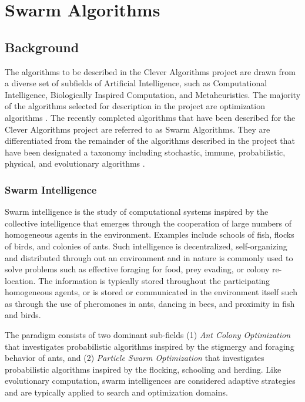 \documentclass[a4paper, 11pt]{article}
\begin{document}
\section{Swarm Algorithms}
\label{sec:algorithms}

% 
% 
\subsection{Background}
The algorithms to be described in the Clever Algorithms project are drawn from a diverse set of subfields of Artificial Intelligence, such as Computational Intelligence, Biologically Inspired Computation, and Metaheuristics. The majority of the algorithms selected for description in the project are optimization algorithms \cite{Brownlee2010b}. 
The recently completed algorithms that have been described for the Clever Algorithms project are referred to as Swarm Algorithms. They are differentiated from the remainder of the algorithms described in the project that have been designated a taxonomy including stochastic, immune, probabilistic, physical, and evolutionary algorithms \cite{Brownlee2010b}. 

\subsubsection{Swarm Intelligence}
Swarm intelligence is the study of computational systems inspired by the collective intelligence that emerges through the cooperation of large numbers of homogeneous agents in the environment. Examples include schools of fish, flocks of birds, and colonies of ants. Such intelligence is decentralized, self-organizing and distributed through out an environment and in nature is commonly used to solve problems such as effective foraging for food, prey evading, or colony re-location. The information is typically stored throughout the participating homogeneous agents, or is stored or communicated in the environment itself such as through the use of pheromones in ants, dancing in bees, and proximity in fish and birds.

The paradigm consists of two dominant sub-fields (1) \emph{Ant Colony Optimization} that investigates probabilistic algorithms inspired by the stigmergy and foraging behavior of ants, and (2) \emph{Particle Swarm Optimization} that investigates probabilistic algorithms inspired by the flocking, schooling and herding. Like evolutionary computation, swarm intelligences are considered adaptive strategies and are typically applied to search and optimization domains.
\end{document}
